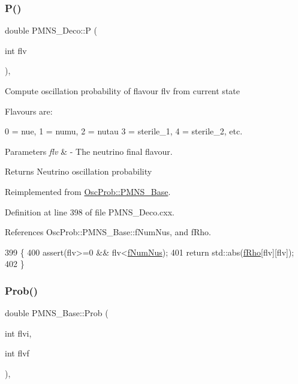 \subsubsection{\texorpdfstring{P()}{P()}}
{\footnotesize\ttfamily double P\+M\+N\+S\+\_\+\+Deco\+::P (\begin{DoxyParamCaption}\item[{int}]{flv }\end{DoxyParamCaption})\hspace{0.3cm}{\ttfamily [protected]}, {\ttfamily [virtual]}}

Compute oscillation probability of flavour flv from current state

Flavours are\+: 
\begin{DoxyPre}
  0 = nue, 1 = numu, 2 = nutau
  3 = sterile\_1, 4 = sterile\_2, etc.
\end{DoxyPre}
 
\begin{DoxyParams}{Parameters}
{\em flv} & -\/ The neutrino final flavour.\\
\hline
\end{DoxyParams}
\begin{DoxyReturn}{Returns}
Neutrino oscillation probability 
\end{DoxyReturn}


Reimplemented from \hyperlink{classOscProb_1_1PMNS__Base_a0dc4d45bc3d7e03b9abbf5b4e100cc22}{Osc\+Prob\+::\+P\+M\+N\+S\+\_\+\+Base}.



Definition at line 398 of file P\+M\+N\+S\+\_\+\+Deco.\+cxx.



References Osc\+Prob\+::\+P\+M\+N\+S\+\_\+\+Base\+::f\+Num\+Nus, and f\+Rho.


\begin{DoxyCode}
399 \{
400   assert(flv>=0 && flv<\hyperlink{classOscProb_1_1PMNS__Base_a24bb74bed63569dfe88b18fa6a08060e}{fNumNus});
401   \textcolor{keywordflow}{return} std::abs(\hyperlink{classOscProb_1_1PMNS__Deco_a0488d62b4ef4cf5b43425769f5fcdbdf}{fRho}[flv][flv]);
402 \}
\end{DoxyCode}
\mbox{\label{classOscProb_1_1PMNS__Base_aec5c399b93261f1962a4b7dbbb44b973}} 
\subsubsection{\texorpdfstring{Prob()}{Prob()}\hspace{0.1cm}{\footnotesize\ttfamily [1/3]}}
{\footnotesize\ttfamily double P\+M\+N\+S\+\_\+\+Base\+::\+Prob (\begin{DoxyParamCaption}\item[{int}]{flvi,  }\item[{int}]{flvf }\end{DoxyParamCaption})\hspace{0.3cm}{\ttfamily [virtual]}, {\ttfamily [inherited]}}

